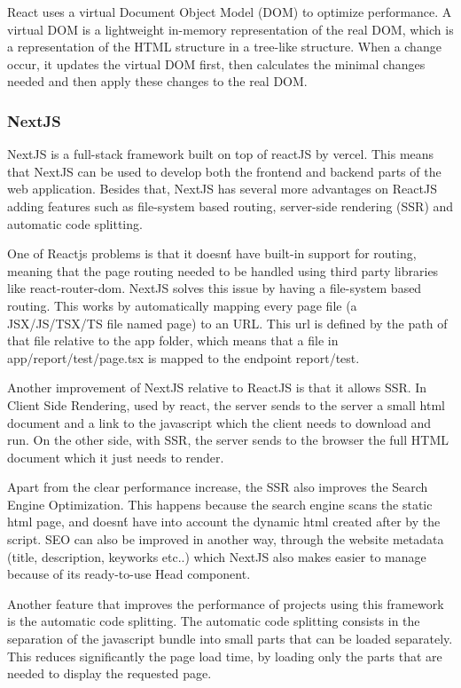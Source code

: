 React uses a virtual Document Object Model (DOM) to optimize performance. A virtual
DOM is a lightweight in-memory representation of the real DOM, which is a
representation of the HTML structure in a tree-like structure. When a change
occur, it updates the virtual DOM first, then calculates the minimal changes needed
and then apply these changes to the real DOM\cite{bawane2022review}.

\subsubsection{NextJS}
NextJS is a full-stack framework built on top of reactJS by vercel. This means
that NextJS can be used to develop both the frontend and backend parts of the
web application. Besides that, NextJS has several more advantages on ReactJS
adding features such as file-system based routing, server-side rendering (SSR)
and automatic code splitting.

One of Reactjs problems is that it doesn\'t have built-in support for routing,
meaning that the page routing needed to be handled using third party libraries
like react-router-dom. NextJS solves this issue by having a file-system based
routing. This works by automatically mapping every page file (a JSX/JS/TSX/TS
file named page) to an URL. This url is defined by the path of that file
relative to the app folder, which means that a file in app/report/test/page.tsx
is mapped to the endpoint report/test.

Another improvement of NextJS relative to ReactJS is that it allows SSR. In
Client Side Rendering, used by react, the server sends to the server a small
html document and a link to the javascript which the client needs to download
and run. On the other side, with SSR, the server sends to the browser the
full HTML document which it just needs to render\cite{Salanke_A.R_G.S_Dalali_2022}.

Apart from the clear performance increase, the SSR also improves the Search
Engine Optimization. This happens because the search engine scans the static
html page, and doesn\'t have into account the dynamic html created after by
the script. SEO can also be improved in another way, through the website
metadata (title, description, keyworks etc..) which NextJS also makes easier to
manage because of its ready-to-use Head component.

Another feature that improves the performance of projects using this framework
is the automatic code splitting. The automatic code splitting consists in
the separation of the javascript bundle into small parts that can be loaded
separately. This reduces significantly the page load time, by loading only the
parts that are needed to display the requested page.

